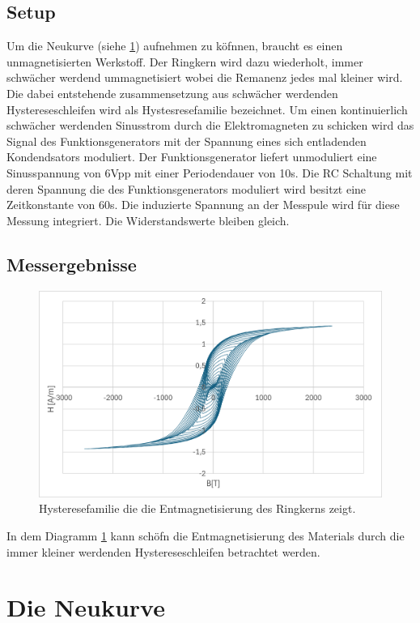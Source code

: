 \documentclass[a4paper,twoside,12pt,DIV=13,BCOR=5mm,numbers=noenddot,cleardoublepage=empty]{scrbook}
\begin{document}
\subsection{Setup}
Um die Neukurve (siehe \ref{Neukurve}) aufnehmen zu k\"ofnnen, braucht es einen unmagnetisierten Werkstoff. 
Der Ringkern wird dazu wiederholt, immer schw\"acher werdend ummagnetisiert wobei die Remanenz jedes mal kleiner wird.
Die dabei entstehende zusammensetzung aus schw\"acher werdenden Hystereseschleifen wird als Hystesresefamilie bezeichnet. 
Um einen kontinuierlich schw\"acher werdenden Sinusstrom durch die Elektromagneten zu schicken wird das Signal des Funktionsgenerators 
mit der Spannung eines sich entladenden Kondendsators moduliert. Der Funktionsgenerator liefert unmoduliert eine Sinusspannung von 6Vpp mit einer Periodendauer von 10s.
Die RC Schaltung mit deren Spannung die des Funktionsgenerators moduliert wird besitzt eine Zeitkonstante von 60s. Die  induzierte Spannung an der Messpule wird f\"ur diese Messung integriert. 
Die Widerstandswerte bleiben gleich.
\subsection{Messergebnisse}
\begin{figure}
  \includegraphics[width=\linewidth]{pictures/Hysteresefamilie.png}
  \caption{Hysteresefamilie die die Entmagnetisierung des Ringkerns zeigt.}
  \label{fig:entmag}
\end{figure}
In dem Diagramm \ref{fig:entmag} kann sch\"ofn die Entmagnetisierung des Materials durch die immer kleiner werdenden Hystereseschleifen betrachtet werden.

\section{Die Neukurve}\label{Neukurve}
\end{document}
